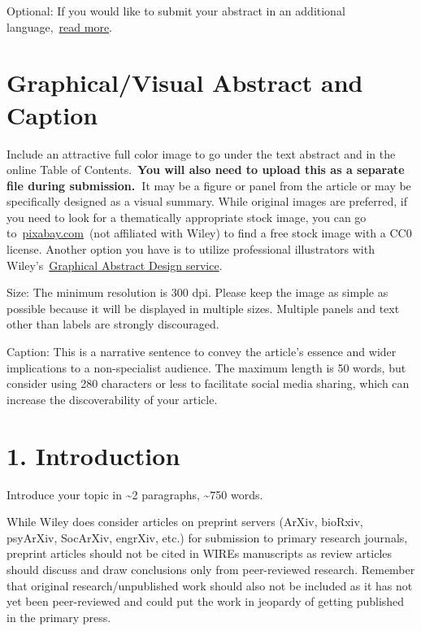 \documentclass[10pt]{article}
\begin{document}
Optional: If you would like to submit your abstract in an additional
language,~\href{http://wires.wiley.com/go/forauthors\#Resources}{read
more}.

\section*{Graphical/Visual Abstract and
Caption}

{\label{750712}}

Include an attractive full color image to go under the text abstract and
in the online Table of Contents.~\textbf{You will also need to upload
this as a separate file during submission.~}It may be a figure or panel
from the article or may be specifically designed as a visual summary.
While original images are preferred, if you need to look for a
thematically appropriate stock image, you can go
to~\href{http://pixabay.com/}{pixabay.com}~(not affiliated with Wiley)
to find a free stock image with a CC0 license. Another option you have
is to utilize professional illustrators with
Wiley's~\href{https://wileyeditingservices.com/en/article-preparation/graphical-abstract-design}{Graphical
Abstract Design service}.

Size: The minimum resolution is 300 dpi. Please keep the image as simple
as possible because it will be displayed in multiple sizes. Multiple
panels and text other than labels are strongly discouraged.

Caption: This is a narrative sentence to convey the article's essence
and wider implications to a non-specialist audience. The maximum length
is 50 words, but consider using 280 characters or less to facilitate
social media sharing, which can increase the discoverability of your
article.

\par\null

\section*{1. Introduction}

{\label{252565}}

Introduce your topic in \textasciitilde{}2 paragraphs,
\textasciitilde{}750 words.

While Wiley does consider articles on preprint servers (ArXiv, bioRxiv,
psyArXiv, SocArXiv, engrXiv, etc.) for submission to primary research
journals, preprint articles should not be cited in WIREs manuscripts as
review articles should discuss and draw conclusions only from
peer-reviewed research. Remember that original research/unpublished work
should also not be included as it has not yet been peer-reviewed and
could put the work in jeopardy of getting published in the primary
press.
\end{document}

